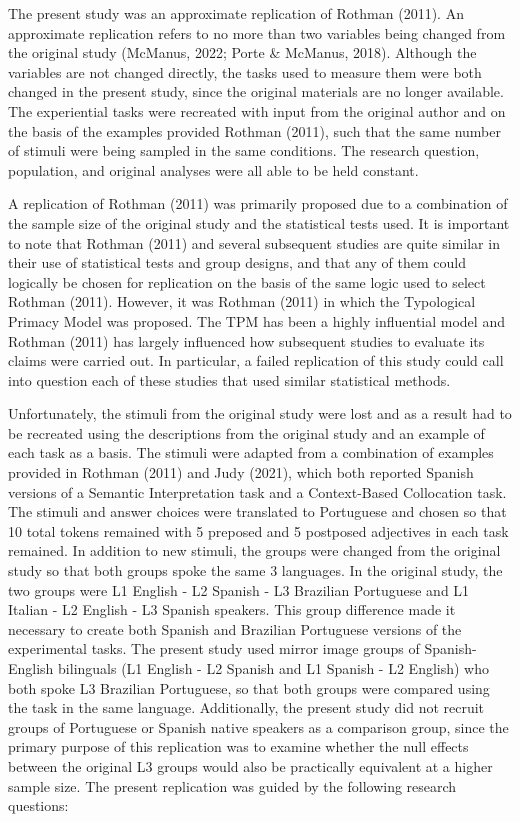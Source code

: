 \documentclass[
  man,floatsintext]{apa6}
\begin{document}
The present study was an approximate replication of Rothman (2011).
An approximate replication refers to no more than two variables being changed from the original study (McManus, 2022; Porte \& McManus, 2018).
Although the variables are not changed directly, the tasks used to measure them were both changed in the present study, since the original materials are no longer available.
The experiential tasks were recreated with input from the original author and on the basis of the examples provided Rothman (2011), such that the same number of stimuli were being sampled in the same conditions.
The research question, population, and original analyses were all able to be held constant.

A replication of Rothman (2011) was primarily proposed due to a combination of the sample size of the original study and the statistical tests used.
It is important to note that Rothman (2011) and several subsequent studies are quite similar in their use of statistical tests and group designs, and that any of them could logically be chosen for replication on the basis of the same logic used to select Rothman (2011).
However, it was Rothman (2011) in which the Typological Primacy Model was proposed.
The TPM has been a highly influential model and Rothman (2011) has largely influenced how subsequent studies to evaluate its claims were carried out.
In particular, a failed replication of this study could call into question each of these studies that used similar statistical methods.

Unfortunately, the stimuli from the original study were lost and as a result had to be recreated using the descriptions from the original study and an example of each task as a basis.
The stimuli were adapted from a combination of examples provided in Rothman (2011) and Judy (2021), which both reported Spanish versions of a Semantic Interpretation task and a Context-Based Collocation task.
The stimuli and answer choices were translated to Portuguese and chosen so that 10 total tokens remained with 5 preposed and 5 postposed adjectives in each task remained.
In addition to new stimuli, the groups were changed from the original study so that both groups spoke the same 3 languages.
In the original study, the two groups were L1 English - L2 Spanish - L3 Brazilian Portuguese and L1 Italian - L2 English - L3 Spanish speakers.
This group difference made it necessary to create both Spanish and Brazilian Portuguese versions of the experimental tasks.
The present study used mirror image groups of Spanish-English bilinguals (L1 English - L2 Spanish and L1 Spanish - L2 English) who both spoke L3 Brazilian Portuguese, so that both groups were compared using the task in the same language.
Additionally, the present study did not recruit groups of Portuguese or Spanish native speakers as a comparison group, since the primary purpose of this replication was to examine whether the null effects between the original L3 groups would also be practically equivalent at a higher sample size.
The present replication was guided by the following research questions:
\end{document}
